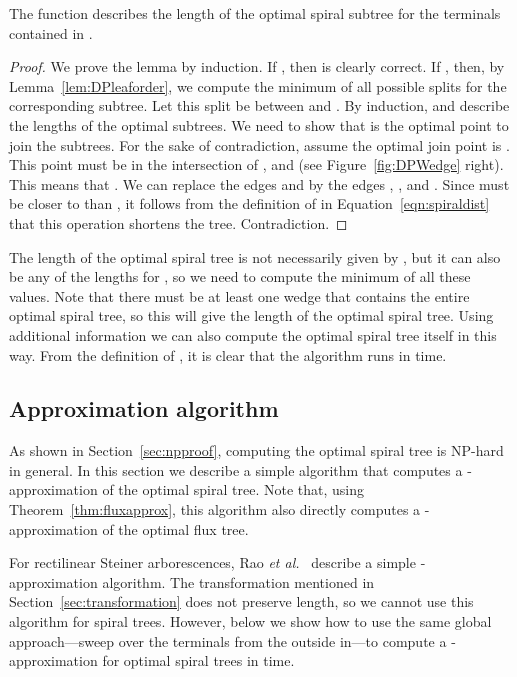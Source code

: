 \documentclass{journalA4}
\newcommand{\etal}{{\emph{et al.}\xspace}}
\begin{document}
\begin{lemma}
The function  describes the length of the optimal spiral subtree for the terminals  contained in .
\end{lemma}
\begin{proof}
We prove the lemma by induction. If , then  is clearly correct. If , then, by Lemma~\ref{lem:DPleaforder}, we compute the minimum of all possible splits for the corresponding subtree. Let this split be between  and . By induction,  and  describe the lengths of the optimal subtrees. We need to show that  is the optimal point to join the subtrees. For the sake of contradiction, assume the optimal join point is . This point must be in the intersection of ,  and  (see Figure~\ref{fig:DPWedge} right). This means that . We can replace the edges  and  by the edges , , and . Since  must be closer to  than , it follows from the definition of  in Equation~\ref{eqn:spiraldist} that this operation shortens the tree. Contradiction.
\end{proof}
The length of the optimal spiral tree is not necessarily given by , but it can also be any of the lengths  for , so we need to compute the minimum of all these values. Note that there must be at least one wedge  that contains the entire optimal spiral tree, so this will give the length of the optimal spiral tree. Using additional information we can also compute the optimal spiral tree itself in this way. From the definition of , it is clear that the algorithm runs in  time.

\subsection{Approximation algorithm} \label{sec:approximation}

As shown in Section~\ref{sec:npproof}, computing the optimal spiral tree is NP-hard in general. In this section we describe a simple algorithm that computes a -approximation of the optimal spiral tree. Note that, using Theorem~\ref{thm:fluxapprox}, this algorithm also directly computes a -approximation of the optimal flux tree.

For rectilinear Steiner arborescences, Rao \etal~\cite{Rao92} describe a simple -approximation algorithm. The transformation mentioned in Section~\ref{sec:transformation} does not preserve length, so we cannot use this algorithm for spiral trees. However, below we show how to use the same global approach---sweep over the terminals from the outside in---to compute a -approximation for optimal spiral trees in  time.
\end{document}
